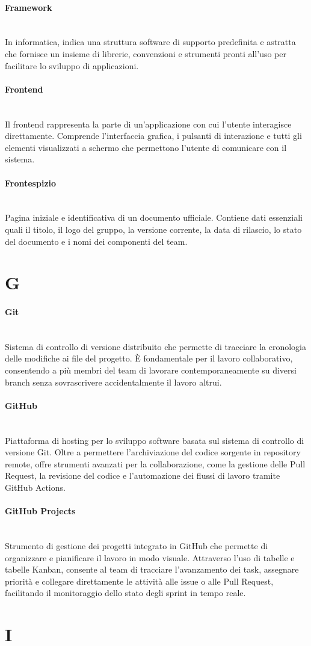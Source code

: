 \documentclass[a4paper, 10pt, colorlinks=true, linkcolor=black, urlcolor=blue, citecolor=blue, hidelinks]{article}
\newcommand{\glossaryterm}[2]{
    \paragraph{#1 \label{term:#1}} \mbox{} \\
    #2
    \vspace{0.5em}
}
\begin{document}
\glossaryterm{Framework}{In informatica, indica una struttura software di supporto predefinita e astratta che fornisce un insieme di librerie, convenzioni e strumenti pronti all'uso per facilitare lo sviluppo di applicazioni.}

\glossaryterm{Frontend}{Il frontend rappresenta la parte di un'applicazione con cui l'utente interagisce direttamente. Comprende l'interfaccia grafica, i pulsanti di interazione e tutti gli elementi visualizzati a schermo che permettono l'utente di comunicare con il sistema.}

\glossaryterm{Frontespizio}{Pagina iniziale e identificativa di un documento ufficiale. Contiene dati essenziali quali il titolo, il logo del gruppo, la versione corrente, la data di rilascio, lo stato del documento e i nomi dei componenti del team.}

\newpage

\section*{G}

\glossaryterm{Git}{Sistema di controllo di versione distribuito che permette di tracciare la cronologia delle modifiche ai file del progetto. È fondamentale per il lavoro collaborativo, consentendo a più membri del team di lavorare contemporaneamente su diversi branch senza sovrascrivere accidentalmente il lavoro altrui.}

\glossaryterm{GitHub}{Piattaforma di hosting per lo sviluppo software basata sul sistema di controllo di versione Git. Oltre a permettere l'archiviazione del codice sorgente in repository remote, offre strumenti avanzati per la collaborazione, come la gestione delle Pull Request, la revisione del codice e l'automazione dei flussi di lavoro tramite GitHub Actions.}

\glossaryterm{GitHub Projects}{Strumento di gestione dei progetti integrato in GitHub che permette di organizzare e pianificare il lavoro in modo visuale. Attraverso l'uso di tabelle e tabelle Kanban, consente al team di tracciare l'avanzamento dei task, assegnare priorità e collegare direttamente le attività alle issue o alle Pull Request, facilitando il monitoraggio dello stato degli sprint in tempo reale.}

\newpage

\section*{I}
\end{document}
